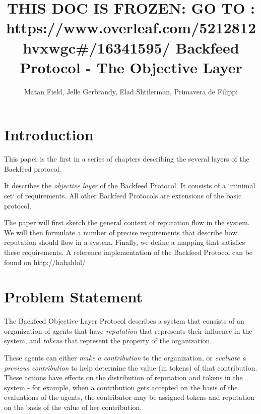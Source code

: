 \documentclass{article}
\begin{document}
\newcommand{\flow}{\Phi}
\newenvironment{condition}[1]
	{
	\begin{center}
	   \begin{tabular}{|p{0.9\textwidth}|}
		\hline\\
		{\bf #1:}\\
	}
	{
		\\ \\\hline
	\end{tabular}
	\end{center}
	}
    
\title{THIS DOC IS FROZEN: GO TO : https://www.overleaf.com/5212812hvxwgc#/16341595/ Backfeed Protocol - The Objective Layer}
\author{Matan Field, Jelle Gerbrandy, Elad Shtilerman, Primavera de Filippi}
\date{}
\maketitle

\tableofcontents

\section{Introduction}

This paper is the first in a series of chapters describing the several layers of the Backfeed protocol. 

It describes the {\em objective layer} of the Backfeed Protocol. It consists of a `minimal set` of requirements. All other Backfeed Protocols are extensions of the basic protocol.

The paper will first sketch the general context of reputation flow in the system. 
We will then formulate a number of precise requirements that describe how reputation should flow in a system. Finally, we define a mapping that satisfies these requirements.
A reference implementation of the Backfeed Protocol can be found on http://hahahlol/

\section{Problem Statement}

The Backfeed Objective Layer Protocol describes a system that consists of an organization of agents that have {\em reputation} that represents their influence in the system, and {\em tokens} that represent the property of the organization.

These agents can either {\em make a contribution} to the organization, or {\em evaluate a previous contribution} to help determine the value (in tokens) of that contribution. These actions have effects on the distribution of reputation and tokens in the system - for example, when a contribution gets accepted on the basis of the evaluations of the agents, the contributor may be assigned tokens and reputation on the basis of the value of her contribution.
\end{document}
